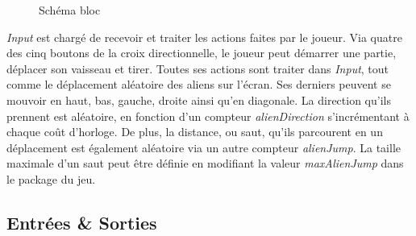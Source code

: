 \documentclass[french]{nakrule}
\begin{document}
\begin{figure}
\caption{Schéma bloc}
\label{inputBloc}
\end{figure}

\emph{Input} est chargé de recevoir et traiter les actions faites par le joueur.
Via quatre des cinq boutons de la croix directionnelle, le joueur peut démarrer
une partie, déplacer son vaisseau et tirer. Toutes ses actions sont traiter dans
\emph{Input}, tout comme le déplacement aléatoire des aliens sur l'écran. Ses
derniers peuvent se mouvoir en haut, bas, gauche, droite ainsi qu'en diagonale.
La direction qu'ils prennent est aléatoire, en fonction d'un compteur
\emph{alienDirection} s'incrémentant à chaque coût d'horloge. De plus, la
distance, ou saut, qu'ils parcourent en un déplacement est également aléatoire
via un autre compteur \emph{alienJump}. La taille maximale d'un saut peut être
définie en modifiant la valeur \emph{maxAlienJump} dans le package du jeu.



\subsection{Entrées \& Sorties}
\label{subsec:Entrees_Sorties_input}
\end{document}
